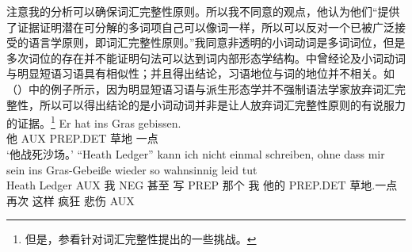 \begin{exe}
\begin{xlist}[iv.]
\begin{exe}
\begin{xlist}[iv.]
注意我的分析可以确保词汇完整性原则。所以我不同意\citet*[]{CSP2010a}的观点，他认为他们“提供了证据证明潜在可分解的多词项自己可以像词一样，所以可以反对一个已被广泛接受的语言学原则，即词汇完整性原则。”我同意非透明的小词动词是多词词位，但是多次词位的存在并不能证明句法可以达到词内部形态学结构。中曾经论及小词动词与明显短语习语具有相似性；并且得出结论，习语地位与词的地位并不相关。如（）中的例子所示，因为明显短语习语与派生形态学并不强制语法学家放弃词汇完整性，所以可以得出结论的是小词动词并非是让人放弃词汇完整性原则的有说服力的证据。\footnote{
  但是，参看针对词汇完整性提出的一些挑战。
}
\eal
\ex
\gll Er hat ins Gras gebissen.\\
     他 AUX PREP.DET 草地 一点\\
\glt `他战死沙场。'
\ex 
\gll "`Heath Ledger"' kann ich nicht einmal schreiben, ohne dass mir sein ins Gras-Gebeiße wieder so
wahnsinnig leid tut%
\footnotemark\\
    \spacebr{}Heath Ledger AUX 我 NEG 甚至 写 PREP 那个 我 他的 PREP.DET 草地.一点 再次 这样
    疯狂 悲伤 AUX\\
\end{xlist}
\end{exe}
\end{xlist}
\end{exe}

